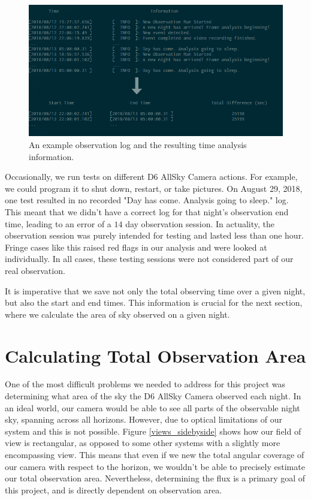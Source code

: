 \begin{figure}[ht!]
  \centering
  \includegraphics[scale=0.51]{images/obslog_time.png}
  \caption{An example observation log and the resulting time analysis information.}
  \label{obslog_time}
\end{figure}

Occasionally, we run tests on different D6 AllSky Camera actions. 
For example, we could program it to shut down, restart, or take pictures.
On August 29, 2018, one test resulted in no recorded "Day has come.  Analysis going to sleep." log.
This meant that we didn't have a correct log for that night's observation end time, leading to an error of a $14$ day observation session.
In actuality, the observation session was purely intended for testing and lasted less than one hour.  
Fringe cases like this raised red flags in our analysis and were looked at individually.
In all cases, these testing sessions were not considered part of our real observation.


It is imperative that we save not only the total observing time over a given night, but also the start and end times. 
This information is crucial for the next section, where we calculate the area of sky observed on a given night.

\section{Calculating Total Observation Area}

One of the most difficult problems we needed to address for this project was determining what area of the sky the D6 AllSky Camera observed each night.  
In an ideal world, our camera would be able to see all parts of the observable night sky, spanning across all horizons.  
However, due to optical limitations of our system and this is not possible.
Figure \ref{views_sidebyside} shows how our field of view is rectangular, as opposed to some other systems with a slightly more encompassing view.
This means that even if we new the total angular coverage of our camera with respect to the horizon, we wouldn't be able to precisely estimate our total observation area.
Nevertheless, determining the flux is a primary goal of this project, and is directly dependent on observation area. 

